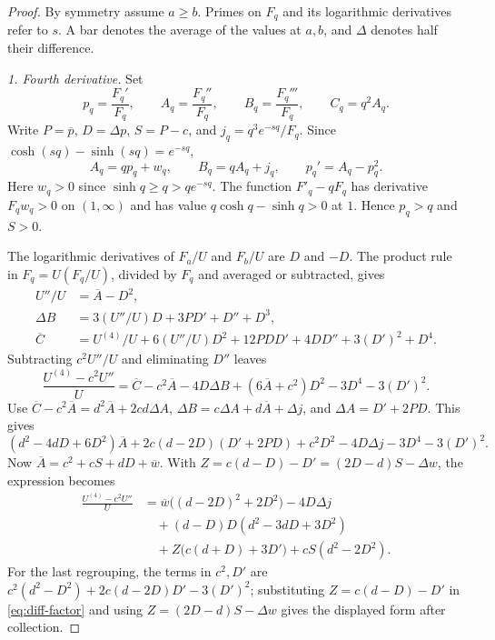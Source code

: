 \documentclass[10pt,twoside,reqno]{amsart}
\numberwithin{equation}{section}
\begin{document}
\begin{proof}
By symmetry assume \(a\ge b\). Primes on \(F_q\) and its logarithmic
derivatives refer to \(s\). A bar denotes the average of the values at
\(a,b\), and \(\Delta\) denotes half their difference.

\medskip\noindent
\textit{1. Fourth derivative.}
Set
\[
 p_q=\frac{F_q'}{F_q},\qquad A_q=\frac{F_q''}{F_q},\qquad
 B_q=\frac{F_q'''}{F_q},\qquad C_q=q^2 A_q.
\]
Write \(P=\overline p\), \(D=\Delta p\), \(S=P-c\), and
\(j_q=q^3e^{-sq}/F_q\).
Since \(\cosh(sq)-\sinh(sq)=e^{-sq}\),
\[
 A_q=qp_q+w_q,\qquad B_q=q A_q+j_q,\qquad
 p_q'=A_q-p_q^2.
\]
Here \(w_q>0\) since \(\sinh q\ge q>qe^{-sq}\).
The function \(F'_q-qF_q\) has derivative \(F_qw_q>0\) on \((1,\infty)\)
and has value \(q\cosh q-\sinh q>0\) at \(1\).
Hence \(p_q>q\) and \(S>0\).

The logarithmic derivatives of \(F_a/U\) and \(F_b/U\) are \(D\) and \(-D\).
The product rule in \(F_q=U(F_q/U)\), divided by \(F_q\) and averaged or
subtracted, gives
\[
 \begin{aligned}
 U''/U&=\overline A-D^2,\\
 \Delta B&=3(U''/U)D+3P D'+D''+D^3,\\
 \overline C&=U^{(4)}/U+6(U''/U)D^2+12PDD'
                +4DD''+3(D')^2+D^4.
 \end{aligned}
\]
Subtracting \(c^2U''/U\) and eliminating \(D''\) leaves
\[
 \frac{U^{(4)}-c^2U''}{U}
 =\overline C-c^2\overline A-4D\Delta B
     +(6\overline A+c^2)D^2-3D^4-3(D')^2.
\]
Use \(\overline C-c^2\overline A=d^2\overline A+2cd\Delta A\),
\(\Delta B=c\Delta A+d\overline A+\Delta j\), and
\(\Delta A=D'+2PD\). This gives
\[
 (d^2-4dD+6D^2)\overline A+2c(d-2D)(D'+2PD)
     +c^2D^2-4D\Delta j-3D^4-3(D')^2.
\]
Now \(\overline A=c^2+cS+dD+\overline w\). With
\(Z=c(d-D)-D'=(2D-d)S-\Delta w\), the expression becomes
\begin{equation}\label{eq:diff-factor}
 \begin{split}
 \frac{U^{(4)}-c^2U''}{U}
 &=\overline w\bigl((d-2D)^2+2D^2\bigr)-4D\Delta j\\
 &\quad +(d-D)D(d^2-3dD+3D^2)\\
 &\quad +Z\bigl(c(d+D)+3D'\bigr)+cS(d^2-2D^2).
 \end{split}
\end{equation}
For the last regrouping, the terms in \(c^2,D'\) are
\(c^2(d^2-D^2)+2c(d-2D)D'-3(D')^2\);
substituting \(Z=c(d-D)-D'\) in \eqref{eq:diff-factor} and using
\(Z=(2D-d)S-\Delta w\) gives the displayed form after collection.


\end{proof}
\end{document}
